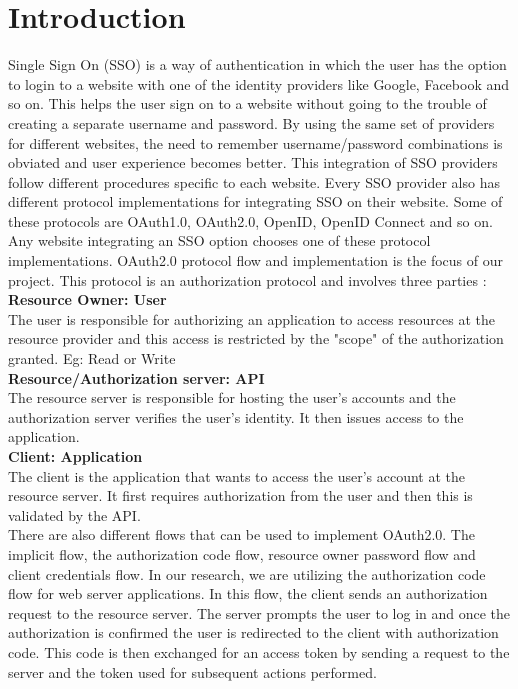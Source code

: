 \section{Introduction}
\label{sec:intro}
Single Sign On (SSO) is a way of authentication in which the user has the option to login to a website with one of the identity providers like Google, Facebook and so on. This helps the user sign on to a website without going to the trouble of creating a separate username and password. By using the same set of providers for different websites, the need to remember username/password combinations is obviated and user experience becomes better. This integration of SSO providers follow different procedures specific to each website. Every SSO provider also has different protocol implementations for integrating SSO on their website. Some of these protocols are OAuth1.0, OAuth2.0, OpenID, OpenID Connect and so on. Any website integrating an SSO option chooses one of these protocol implementations. OAuth2.0 protocol flow and implementation is the focus of our project. This protocol is an authorization protocol and involves three parties : \\	  
\textbf{Resource Owner: User}\\
The user is responsible for authorizing an application to access resources at the resource provider and this access is restricted by the "scope" of 			the authorization granted. Eg: Read or Write\\
\textbf{Resource/Authorization server: API}\\
The resource server is responsible for hosting the user's accounts and the authorization server verifies the user's identity. It then issues access to the 	application. \\
\textbf{Client: Application}\\
The client is the application that wants to access the user's account at the resource server. It first requires authorization from the user and then this is 	validated by the API. \\
There are also different flows that can be used to implement OAuth2.0. The implicit flow, the authorization code flow, resource owner password flow and client credentials flow. In our research, we are utilizing the authorization code flow for web server applications. In this flow, the client sends an authorization request to the resource server. The server prompts the user to log in and once the authorization is confirmed the user is redirected to the client with authorization code. This code is then exchanged for an access token by sending a request to the server and the token used for subsequent actions performed. 

